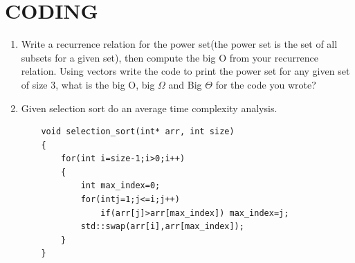 \documentclass[a4paper]{article}
\begin{document}
\section{CODING}
\begin{enumerate}
    \item Write a recurrence relation for the power set(the power set is the set of all subsets for a given set), then compute the big O from your recurrence relation. 
    Using vectors write the code to print the power set for any given set of size 3, what is the big O, big $\Omega$ and Big $\Theta$  for the code you wrote? 
    
    \item Given selection sort do an average time complexity analysis.
    \begin{verbatim}
    void selection_sort(int* arr, int size)
    {
        for(int i=size-1;i>0;i++)
        {
            int max_index=0;
            for(intj=1;j<=i;j++)
                if(arr[j]>arr[max_index]) max_index=j;
            std::swap(arr[i],arr[max_index]);
        }
    }
    \end{verbatim}
\end{enumerate}
\end{document}
